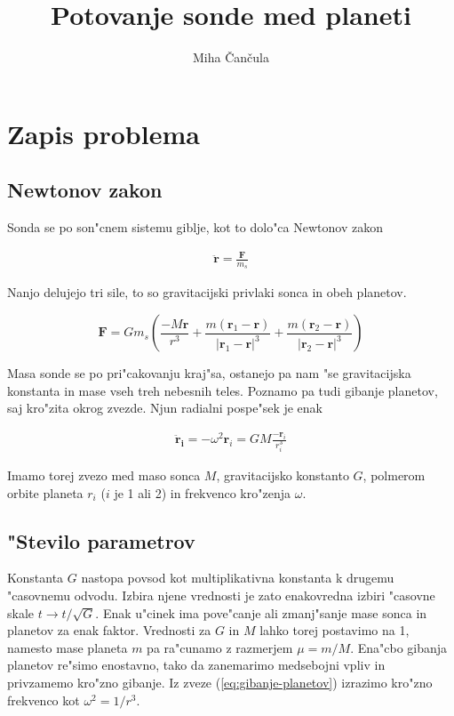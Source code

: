 \documentclass[a4paper,10pt]{article}
\title{Potovanje sonde med planeti}
\author{Miha \v Can\v cula}
\renewcommand{\vec}{\mathbf}
\begin{document}
\maketitle

\section{Zapis problema}

\subsection{Newtonov zakon}
Sonda se po son"cnem sistemu giblje, kot to dolo"ca Newtonov zakon

\begin{align}
  \vec{\ddot r}= \frac{\vec F}{m_s}
\end{align}

Nanjo delujejo tri sile, to so gravitacijski privlaki sonca in obeh planetov. 

$$ \vec F = Gm_s \left( \frac{-M\vec r}{r^3} + \frac{m(\vec r_1 - \vec r)}{|\vec r_1 - \vec r|^3} + \frac{m(\vec r_2 - \vec r)}{|\vec r_2 - \vec r|^3} \right) $$

Masa sonde se po pri"cakovanju kraj"sa, ostanejo pa nam "se gravitacijska konstanta in mase vseh treh nebesnih teles. Poznamo pa tudi gibanje planetov, saj kro"zita okrog zvezde. Njun radialni pospe"sek je enak

\begin{align}
\label{eq:gibanje-planetov}
\vec{\ddot r_i} = -\omega^2\vec r_i = GM \frac{-\vec r_i}{r_i^3}
\end{align}

Imamo torej zvezo med maso sonca $M$, gravitacijsko konstanto $G$, polmerom orbite planeta $r_i$ ($i$ je 1 ali 2) in frekvenco kro"zenja $\omega$. 

\subsection{"Stevilo parametrov}
Konstanta $G$ nastopa povsod kot multiplikativna konstanta k drugemu "casovnemu odvodu. Izbira njene vrednosti je zato enakovredna izbiri "casovne skale $t \to t/\sqrt{G}$. Enak u"cinek ima pove"canje ali zmanj"sanje mase sonca in planetov za enak faktor. Vrednosti za $G$ in $M$ lahko torej postavimo na 1, namesto mase planeta $m$ pa ra"cunamo z razmerjem $\mu = m/M$. Ena"cbo gibanja planetov re"simo enostavno, tako da zanemarimo medsebojni vpliv in privzamemo kro"zno gibanje. Iz zveze (\ref{eq:gibanje-planetov}) izrazimo kro"zno frekvenco kot $\omega^2 = 1/r^3$. 
\end{document}
